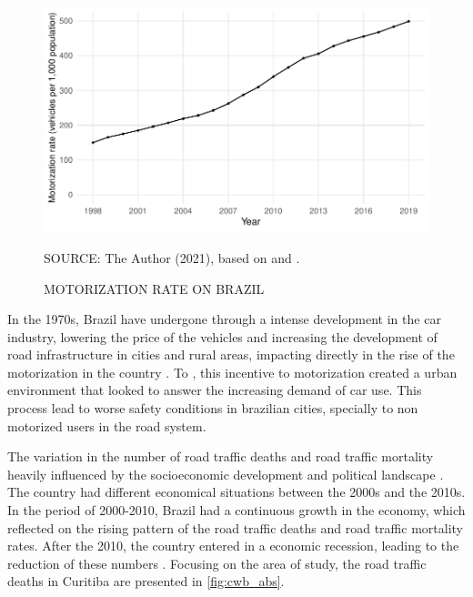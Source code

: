 
\begin{figure}[!htbp]
    \centering\footnotesize
    \captionsetup{font=footnotesize}
    \caption{MOTORIZATION RATE ON BRAZIL}
    \includegraphics{fig/brazil_motor.pdf}
    \label{fig:br_motor}
    \par SOURCE: The Author (2021), based on \textcite{MinistryofHealth2021} and \textcite{DENATRAN2020}.
\end{figure} 



In the 1970s, Brazil have undergone through a intense development in the car industry, lowering the price of the vehicles and increasing the development of road infrastructure in cities and rural areas, impacting directly in the rise of the motorization in the country \cite{Vasconcellos2013}. To \textcite{Harvey1982}, this incentive to motorization created a urban environment that looked to answer the increasing demand of car use. This process lead to worse safety conditions in brazilian cities, specially to non motorized users in the road system.   

The variation in the number of road traffic deaths and road traffic mortality heavily influenced by the socioeconomic development and political landscape \cite{Ferraz2012}. The country had different economical situations between the 2000s and the 2010s. In the period of 2000-2010, Brazil had a continuous growth in the economy, which reflected on the rising pattern of the road traffic deaths and road traffic mortality rates. After the 2010, the country entered in a economic recession, leading to the reduction of these numbers \cite{Bastos2020}. Focusing on the area of study, the road traffic deaths in Curitiba are presented in \autoref{fig:cwb_abs}.   

